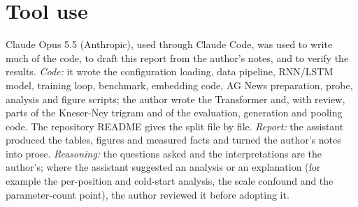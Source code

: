 \documentclass[10pt]{article}
\begin{document}
\section{Tool use}\label{app:tools}
Claude Opus 5.5 (Anthropic), used through Claude Code, was used to write much of the code, to draft this report from the author's notes, and to verify the results. \emph{Code:} it wrote the configuration loading, data pipeline, RNN/LSTM model, training loop, benchmark, embedding code, AG News preparation, probe, analysis and figure scripts; the author wrote the Transformer and, with review, parts of the Kneser-Ney trigram and of the evaluation, generation and pooling code. The repository README gives the split file by file. \emph{Report:} the assistant produced the tables, figures and measured facts and turned the author's notes into prose. \emph{Reasoning:} the questions asked and the interpretations are the author's; where the assistant suggested an analysis or an explanation (for example the per-position and cold-start analysis, the scale confound and the parameter-count point), the author reviewed it before adopting it.
\end{document}
